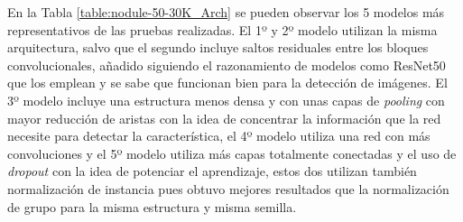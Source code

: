 En la Tabla \ref{table:nodule-50-30K_Arch} se pueden observar los 5 modelos más representativos de las pruebas realizadas. El 1º y 2º modelo utilizan la misma arquitectura, salvo que el segundo incluye saltos residuales entre los bloques convolucionales, añadido siguiendo el razonamiento de modelos como ResNet50 que los emplean y se sabe que funcionan bien para la detección de imágenes. El 3º modelo incluye una estructura menos densa y con unas capas de \textit{pooling} con mayor reducción de aristas con la idea de concentrar la información que la red necesite para detectar la característica, el 4º modelo utiliza una red con más convoluciones y el 5º modelo utiliza más capas totalmente conectadas y el uso de \textit{dropout} con la idea de potenciar el aprendizaje, estos dos utilizan también normalización de instancia pues obtuvo mejores resultados que la normalización de grupo para la misma estructura y misma semilla.

\begin{table}[h]
\centering
{}
\caption[Nodule-50-30K-*: Resultados en test]{Modelos , resultados en el conjunto de test}
\label{table:nodule-50-30K_results}
\end{table}

